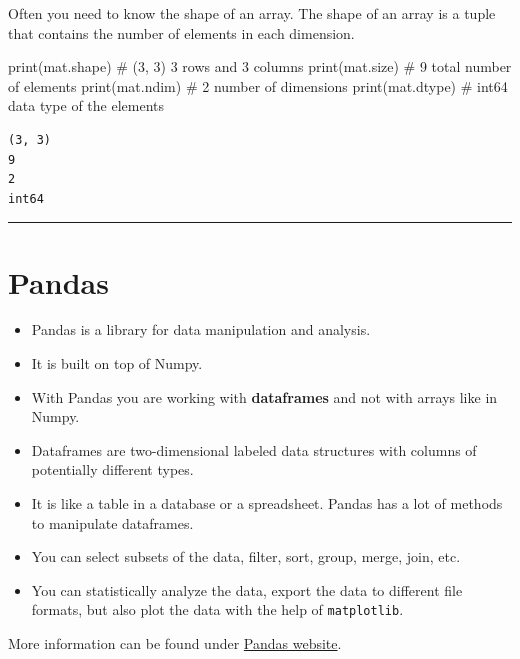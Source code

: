 \documentclass[
  letterpaper,
  DIV=11,
  numbers=noendperiod]{scrreprt}
\newenvironment{Shaded}{\begin{snugshade}}{\end{snugshade}}
\newcommand{\BuiltInTok}[1]{\textcolor[rgb]{0.00,0.23,0.31}{#1}}
\newcommand{\CommentTok}[1]{\textcolor[rgb]{0.37,0.37,0.37}{#1}}
\newcommand{\NormalTok}[1]{\textcolor[rgb]{0.00,0.23,0.31}{#1}}
\providecommand{\tightlist}{%
  \setlength{\itemsep}{0pt}\setlength{\parskip}{0pt}}\usepackage{longtable,booktabs,array}
\begin{document}
Often you need to know the shape of an array. The shape of an array is a
tuple that contains the number of elements in each dimension.

\begin{Shaded}
\begin{Highlighting}[]
\BuiltInTok{print}\NormalTok{(mat.shape) }\CommentTok{\# (3, 3) 3 rows and 3 columns}
\BuiltInTok{print}\NormalTok{(mat.size)  }\CommentTok{\# 9 total number of elements}
\BuiltInTok{print}\NormalTok{(mat.ndim)  }\CommentTok{\# 2 number of dimensions}
\BuiltInTok{print}\NormalTok{(mat.dtype) }\CommentTok{\# int64 data type of the elements}
\end{Highlighting}
\end{Shaded}

\begin{verbatim}
(3, 3)
9
2
int64
\end{verbatim}

\begin{center}\rule{0.5\linewidth}{0.5pt}\end{center}

\section*{Pandas}\label{pandas}


\begin{itemize}
\tightlist
\item
  Pandas is a library for data manipulation and analysis.
\item
  It is built on top of Numpy.
\item
  With Pandas you are working with \textbf{dataframes} and not with
  arrays like in Numpy.
\item
  Dataframes are two-dimensional labeled data structures with columns of
  potentially different types.
\item
  It is like a table in a database or a spreadsheet. Pandas has a lot of
  methods to manipulate dataframes.
\item
  You can select subsets of the data, filter, sort, group, merge, join,
  etc.
\item
  You can statistically analyze the data, export the data to different
  file formats, but also plot the data with the help of
  \texttt{matplotlib}.
\end{itemize}

More information can be found under
\href{https://pandas.pydata.org/}{Pandas website}.
\end{document}
